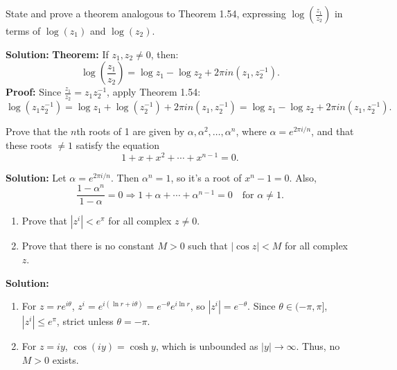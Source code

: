 \begin{problembox}
State and prove a theorem analogous to Theorem 1.54, expressing \( \log\left( \frac{z_1}{z_2} \right) \) in terms of \( \log(z_1) \) and \( \log(z_2) \).
\end{problembox}

\textbf{Solution:}
\textbf{Theorem:} If \( z_1, z_2 \neq 0 \), then:
\[
\log\left( \frac{z_1}{z_2} \right) = \log z_1 - \log z_2 + 2\pi i n(z_1, z_2^{-1}).
\]
\textbf{Proof:}
Since \( \frac{z_1}{z_2} = z_1 z_2^{-1} \), apply Theorem 1.54:
\[
\log(z_1 z_2^{-1}) = \log z_1 + \log(z_2^{-1}) + 2\pi i n(z_1, z_2^{-1}) = \log z_1 - \log z_2 + 2\pi i n(z_1, z_2^{-1}).
\]

\begin{problembox}
Prove that the \( n \)th roots of 1 are given by \( \alpha, \alpha^2, \ldots, \alpha^n \), where \( \alpha = e^{2\pi i/n} \), and that these roots \( \ne 1 \) satisfy the equation
\[
1 + x + x^2 + \cdots + x^{n-1} = 0.
\]
\end{problembox}

\textbf{Solution:}
Let \( \alpha = e^{2\pi i/n} \). Then \( \alpha^n = 1 \), so it’s a root of \( x^n - 1 = 0 \). Also,
\[
\frac{1 - \alpha^n}{1 - \alpha} = 0 \Rightarrow 1 + \alpha + \cdots + \alpha^{n-1} = 0 \quad \text{for } \alpha \ne 1.
\]

\begin{problembox}
\begin{enumerate}[label=\alph*)]
\item Prove that \( |z^i| < e^{\pi} \) for all complex \( z \ne 0 \).
\item Prove that there is no constant \( M > 0 \) such that \( |\cos z| < M \) for all complex \( z \).
\end{enumerate}
\end{problembox}

\textbf{Solution:}
\begin{enumerate}[label=\alph*)]
\item For \( z = re^{i\theta} \), \( z^i = e^{i(\ln r + i\theta)} = e^{-\theta} e^{i \ln r} \), so \( |z^i| = e^{-\theta} \). Since \( \theta \in (-\pi, \pi] \), \( |z^i| \leq e^{\pi} \), strict unless \( \theta = -\pi \).
\item For \( z = iy \), \( \cos(iy) = \cosh y \), which is unbounded as \( |y| \to \infty \). Thus, no \( M > 0 \) exists.
\end{enumerate}

